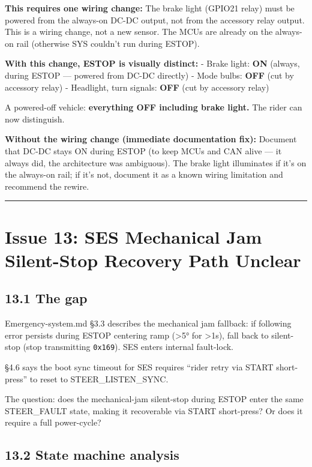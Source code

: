 \documentclass[12pt,a4paper,oneside]{report}
\begin{document}
\textbf{This requires one wiring change:} The brake light (GPIO21 relay) must be
powered from the always-on DC-DC output, not from the accessory relay output.
This is a wiring change, not a new sensor. The MCUs are already on the always-on
rail (otherwise SYS couldn't run during ESTOP).

\textbf{With this change, ESTOP is visually distinct:} - Brake light:
\textbf{ON} (always, during ESTOP --- powered from DC-DC directly) - Mode bulbs:
\textbf{OFF} (cut by accessory relay) - Headlight, turn signals: \textbf{OFF}
(cut by accessory relay)

A powered-off vehicle: \textbf{everything OFF including brake light.} The rider
can now distinguish.

\textbf{Without the wiring change (immediate documentation fix):} Document that
DC-DC stays ON during ESTOP (to keep MCUs and CAN alive --- it always did, the
architecture was ambiguous). The brake light illuminates if it's on the
always-on rail; if it's not, document it as a known wiring limitation and
recommend the rewire.

\begin{center}\rule{0.5\linewidth}{0.5pt}\end{center}

\section{Issue 13: SES Mechanical Jam Silent-Stop Recovery Path
Unclear}\label{issue-13-SES-mechanical-jam-silent-stop-recovery-path-unclear}

\subsection{13.1 The gap}\label{the-gap-6}

Emergency-system.md §3.3 describes the mechanical jam fallback: if following
error persists during ESTOP centering ramp (\textgreater5° for \textgreater1s),
fall back to silent-stop (stop transmitting \texttt{0x169}). SES enters
internal fault-lock.

§4.6 says the boot sync timeout for SES requires ``rider retry via START
short-press'' to reset to STEER\_LISTEN\_SYNC.

The question: does the mechanical-jam silent-stop during ESTOP enter the same
STEER\_FAULT state, making it recoverable via START short-press? Or does it
require a full power-cycle?

\subsection{13.2 State machine analysis}\label{state-machine-analysis}
\end{document}
